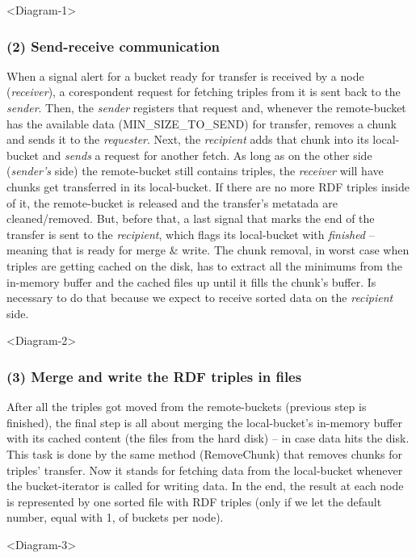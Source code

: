 <Diagram-1>

% 
\subsubsection*{(2) Send-receive communication}

When a signal alert for a bucket ready for transfer is received by a node (\textit{receiver}), a corespondent request for fetching triples from it is sent back to the \textit{sender}. Then, the \textit{sender} registers that request and, whenever the remote-bucket has the available data (MIN\_SIZE\_TO\_SEND) for transfer, removes a chunk and sends it to the \textit{requester}. Next, the \textit{recipient} adds that chunk into its local-bucket and \textit{sends} a request for another fetch. As long as on the other side (\textit{sender's} side) the remote-bucket still contains triples, the \textit{receiver} will have chunks get transferred in its local-bucket. If there are no more RDF triples inside of it, the remote-bucket is released and the transfer's metatada are cleaned/removed. But, before that, a last signal that marks the end of the transfer is sent to the \textit{recipient}, which flags its local-bucket with \textit{finished} -- meaning that is ready for merge \& write. The chunk removal, in worst case when triples are getting cached on the disk, has to extract all the minimums from the in-memory buffer and the cached files up until it fills the chunk's buffer. Is necessary to do that because we expect to receive sorted data on the \textit{recipient} side.

<Diagram-2>

% 
\subsubsection*{(3) Merge and write the RDF triples in files}

After all the triples got moved from the remote-buckets (previous step is finished), the final step is all about merging the local-bucket's in-memory buffer with its cached content (the files from the hard disk) -- in case data hits the disk. This task is done by the same method (RemoveChunk) that removes chunks for triples' transfer. Now it stands for fetching data from the local-bucket whenever the bucket-iterator is called for writing data. In the end, the result at each node is represented by one sorted file with RDF triples (only if we let the default number, equal with 1, of buckets per node).

<Diagram-3>

